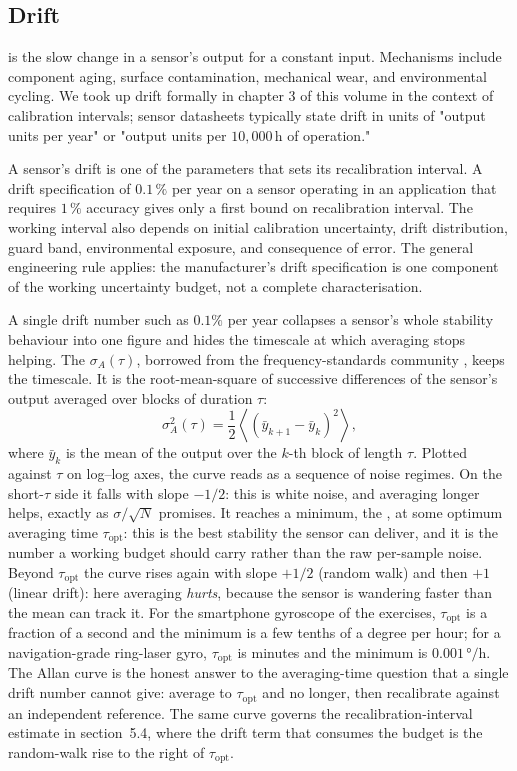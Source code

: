 \subsection{Drift}

 is the slow change in a sensor's output for a
constant input. Mechanisms include component aging, surface
contamination, mechanical wear, and environmental cycling. We took
up drift formally in chapter 3 of this volume in the context of
calibration intervals; sensor datasheets typically state drift in
units of "output units per year" or "output units per
$10{,}000 \,\si{\hour}$ of operation."

A sensor's drift is one of the parameters that sets its
recalibration interval. A drift specification of $0.1\,\%$ per year
on a sensor operating in an application that requires $1\,\%$
accuracy gives only a first bound on recalibration interval. The
working interval also depends on initial calibration uncertainty,
drift distribution, guard band, environmental exposure, and
consequence of error. The general engineering rule applies: the
manufacturer's drift specification is one component of the working
uncertainty budget, not a complete characterisation.

\begin{mastery}
A single drift number such as $0.1\%$ per year collapses a
sensor's whole stability behaviour into one figure and hides the
timescale at which averaging stops helping. The
 $\sigma_{A}(\tau)$, borrowed from the
frequency-standards community \cite{paper:ch05-allan-1966}, keeps
the timescale. It is the root-mean-square of successive differences
of the sensor's output averaged over blocks of duration $\tau$:
\[
\sigma_{A}^{2}(\tau) = \frac{1}{2} \left\langle
(\bar{y}_{k+1} - \bar{y}_{k})^{2} \right\rangle,
\]
where $\bar{y}_{k}$ is the mean of the output over the $k$-th block
of length $\tau$. Plotted against $\tau$ on log--log axes, the curve
reads as a sequence of noise regimes. On the short-$\tau$ side it
falls with slope $-1/2$: this is white noise, and averaging longer
helps, exactly as $\sigma/\sqrt{N}$ promises. It reaches a minimum,
the , at some optimum averaging time
$\tau_{\text{opt}}$: this is the best stability the sensor can
deliver, and it is the number a working budget should carry rather
than the raw per-sample noise. Beyond $\tau_{\text{opt}}$ the curve
rises again with slope $+1/2$ (random walk) and then $+1$ (linear
drift): here averaging \emph{hurts}, because the sensor is wandering
faster than the mean can track it. For the smartphone gyroscope of
the exercises, $\tau_{\text{opt}}$ is a fraction of a second and the
minimum is a few tenths of a degree per hour; for a navigation-grade
ring-laser gyro, $\tau_{\text{opt}}$ is minutes and the minimum is
$0.001 \,\si{\degree}/\si{\hour}$. The Allan curve is the honest
answer to the averaging-time question that a single drift number
cannot give: average to $\tau_{\text{opt}}$ and no longer, then
recalibrate against an independent reference. The same curve
governs the recalibration-interval estimate in section~5.4, where
the drift term that consumes the budget is the random-walk rise to
the right of $\tau_{\text{opt}}$.
\end{mastery}

